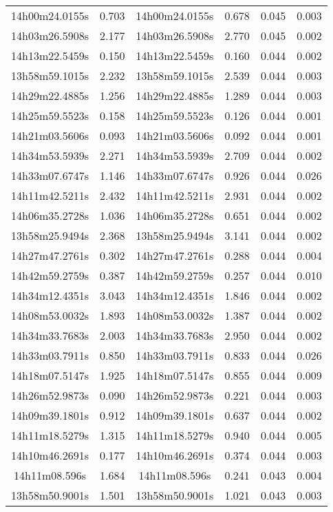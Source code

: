 \begin{table}
\begin{tabular}{cccccc}
14h00m24.0155s & 0.703 & 14h00m24.0155s & 0.678 & 0.045 & 0.003 \\
14h03m26.5908s & 2.177 & 14h03m26.5908s & 2.770 & 0.045 & 0.002 \\
14h13m22.5459s & 0.150 & 14h13m22.5459s & 0.160 & 0.044 & 0.002 \\
13h58m59.1015s & 2.232 & 13h58m59.1015s & 2.539 & 0.044 & 0.003 \\
14h29m22.4885s & 1.256 & 14h29m22.4885s & 1.289 & 0.044 & 0.003 \\
14h25m59.5523s & 0.158 & 14h25m59.5523s & 0.126 & 0.044 & 0.001 \\
14h21m03.5606s & 0.093 & 14h21m03.5606s & 0.092 & 0.044 & 0.001 \\
14h34m53.5939s & 2.271 & 14h34m53.5939s & 2.709 & 0.044 & 0.002 \\
14h33m07.6747s & 1.146 & 14h33m07.6747s & 0.926 & 0.044 & 0.026 \\
14h11m42.5211s & 2.432 & 14h11m42.5211s & 2.931 & 0.044 & 0.002 \\
14h06m35.2728s & 1.036 & 14h06m35.2728s & 0.651 & 0.044 & 0.002 \\
13h58m25.9494s & 2.368 & 13h58m25.9494s & 3.141 & 0.044 & 0.002 \\
14h27m47.2761s & 0.302 & 14h27m47.2761s & 0.288 & 0.044 & 0.004 \\
14h42m59.2759s & 0.387 & 14h42m59.2759s & 0.257 & 0.044 & 0.010 \\
14h34m12.4351s & 3.043 & 14h34m12.4351s & 1.846 & 0.044 & 0.002 \\
14h08m53.0032s & 1.893 & 14h08m53.0032s & 1.387 & 0.044 & 0.002 \\
14h34m33.7683s & 2.003 & 14h34m33.7683s & 2.950 & 0.044 & 0.002 \\
14h33m03.7911s & 0.850 & 14h33m03.7911s & 0.833 & 0.044 & 0.026 \\
14h18m07.5147s & 1.925 & 14h18m07.5147s & 0.855 & 0.044 & 0.009 \\
14h26m52.9873s & 0.090 & 14h26m52.9873s & 0.221 & 0.044 & 0.003 \\
14h09m39.1801s & 0.912 & 14h09m39.1801s & 0.637 & 0.044 & 0.002 \\
14h11m18.5279s & 1.315 & 14h11m18.5279s & 0.940 & 0.044 & 0.005 \\
14h10m46.2691s & 0.177 & 14h10m46.2691s & 0.374 & 0.044 & 0.003 \\
14h11m08.596s & 1.684 & 14h11m08.596s & 0.241 & 0.043 & 0.004 \\
13h58m50.9001s & 1.501 & 13h58m50.9001s & 1.021 & 0.043 & 0.003 \\

\end{tabular}
\end{table}

